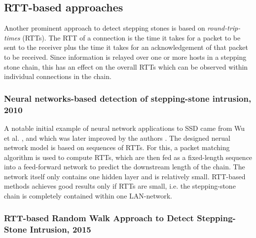 \documentclass[runningheads]{llncs}\usepackage[]{graphicx}\usepackage[]{color}
\begin{document}
\subsection{RTT-based approaches}

Another prominent approach to detect stepping stones is based on \textit{round-trip-times} (RTTs). The RTT of a connection is the time it takes for a packet to be sent to the receiver plus the time it takes for an acknowledgement of that packet to be received. Since information is relayed over one or more hosts in a stepping stone chain, this has an effect on the overall RTTs which can be observed within individual connections in the chain.


\subsubsection{Neural networks-based detection of stepping-stone intrusion, 2010}

A notable initial example of neural network applications to SSD came from Wu et al. \cite{wu2008performance}, and which was later improved by the authors \cite{wu2008performance}.
The designed nerual network model is based on sequences of RTTs. For this, a packet matching algorithm is used to compute RTTs, which are then fed as a fixed-length sequence into a feed-forward network to predict the downstream length of the chain. The network itself only contains one hidden layer and is relatively small. RTT-based methods achieves good results only if RTTs are small, i.e. the stepping-stone chain is completely contained within one LAN-network.


\subsubsection{RTT-based Random Walk Approach to Detect Stepping-Stone Intrusion, 2015}
\end{document}
